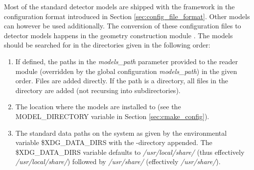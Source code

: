 Most of the standard detector models are shipped with the framework in the configuration format introduced in Section \ref{sec:config_file_format}. Other models can however be used additionally. The conversion of these configuration files to detector models happens in the geometry construction module . The models should be searched for in the directories given in the following order:
\begin{enumerate}
\item If defined, the paths in the \textit{models\_path} parameter provided to the reader module (overridden by the global configuration \textit{models\_path}) in the given order. Files are added directly. If the path is a directory, all files in the directory are added (not recursing into subdirectories).
\item The location where the models are installed to (see the MODEL\_DIRECTORY variable in Section \ref{sec:cmake_config}). 
\item The standard data paths on the system as given by the environmental variable \$XDG\_DATA\_DIRS with the \project-directory appended. The \$XDG\_DATA\_DIRS variable defaults to \textit{/usr/local/share/} (thus effectively \textit{/usr/local/share/\project}) followed by \textit{/usr/share/} (effectively \textit{/usr/share/\project}).
\end{enumerate}


